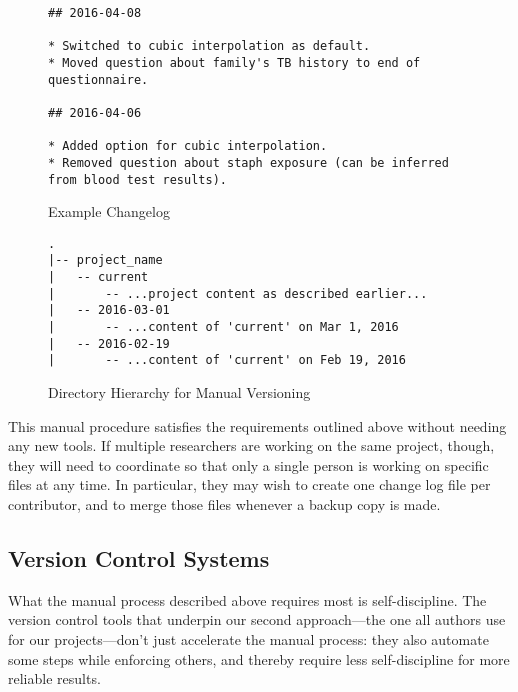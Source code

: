 \documentclass[10pt]{article}
\begin{document}
\begin{figure}
\begin{verbatim}
## 2016-04-08

* Switched to cubic interpolation as default.
* Moved question about family's TB history to end of questionnaire.

## 2016-04-06

* Added option for cubic interpolation.
* Removed question about staph exposure (can be inferred from blood test results).
\end{verbatim}
\caption{Example Changelog}
\label{fig:changelog}
\end{figure}

\begin{figure}
\begin{verbatim}
.
|-- project_name
|   -- current
|       -- ...project content as described earlier...
|   -- 2016-03-01
|       -- ...content of 'current' on Mar 1, 2016
|   -- 2016-02-19
|       -- ...content of 'current' on Feb 19, 2016
\end{verbatim}
\caption{Directory Hierarchy for Manual Versioning}
\label{fig:manual}
\end{figure}

This manual procedure satisfies the requirements outlined above
without needing any new tools. If multiple researchers are working on
the same project, though, they will need to coordinate so that only a
single person is working on specific files at any time. In particular,
they may wish to create one change log file per contributor, and to
merge those files whenever a backup copy is made.

\subsection*{Version Control Systems}

What the manual process described above requires most is
self-discipline. The version control tools that underpin our second
approach---the one all authors use for our projects---don't just
accelerate the manual process: they also automate some steps while
enforcing others, and thereby require less self-discipline for more
reliable results.
\end{document}
